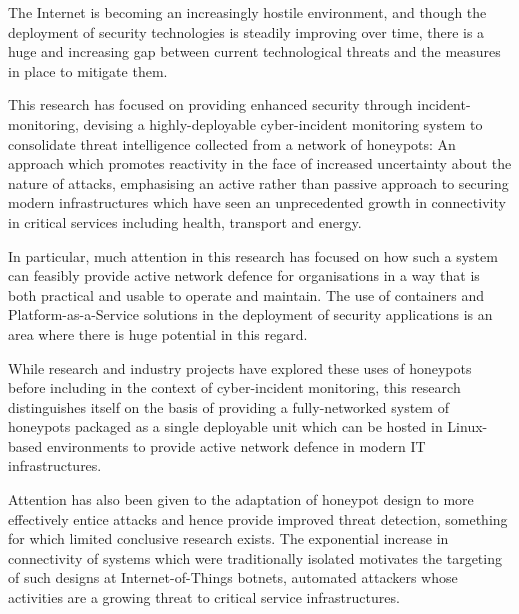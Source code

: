 \documentclass[a4paper, 12pt, oneside]{report}
\begin{document}
\setcounter{secnumdepth}{5}
\setcounter{tocdepth}{3}


\begin{thesisabstract}
  The Internet is becoming an increasingly hostile environment, and though the deployment of security technologies is steadily improving over time, there is a huge and increasing gap between current technological threats and the measures in place to mitigate them.
    
  This research has focused on providing enhanced security through incident-monitoring, devising a highly-deployable cyber-incident monitoring system to consolidate threat intelligence collected from a network of honeypots: An approach which promotes reactivity in the face of increased uncertainty about the nature of attacks, emphasising an active rather than passive approach to securing modern infrastructures which have seen an unprecedented growth in connectivity in critical services including health, transport and energy.

In particular, much attention in this research has focused on how such a system can feasibly provide active network defence for organisations in a way that is both practical and usable to operate and maintain. The use of containers and Platform-as-a-Service solutions in the deployment of security applications is an area where there is huge potential in this regard.

While research and industry projects have explored these uses of honeypots before including in the context of cyber-incident monitoring, this research distinguishes itself on the basis of providing a fully-networked system of honeypots packaged as a single deployable unit which can be hosted in Linux-based environments to provide active network defence in modern IT infrastructures. 

Attention has also been given to the adaptation of honeypot design to more effectively entice attacks and hence provide improved threat detection, something for which limited conclusive research exists. The exponential increase in connectivity of systems which were traditionally isolated motivates the targeting of such designs at Internet-of-Things botnets, automated attackers whose activities are a growing threat to critical service infrastructures.
\end{thesisabstract}
\end{document}
